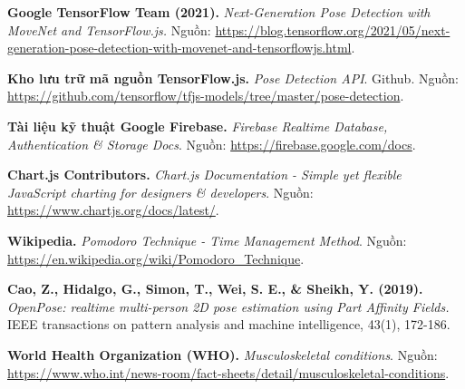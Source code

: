 \documentclass[12pt,a4paper]{report}
\begin{document}
\begin{enumerate}[label={[\arabic*]}]
    \item \textbf{Google TensorFlow Team (2021).} \textit{Next-Generation Pose Detection with MoveNet and TensorFlow.js.} Nguồn: \url{https://blog.tensorflow.org/2021/05/next-generation-pose-detection-with-movenet-and-tensorflowjs.html}.
    
    \item \textbf{Kho lưu trữ mã nguồn TensorFlow.js.} \textit{Pose Detection API}. Github. Nguồn: \url{https://github.com/tensorflow/tfjs-models/tree/master/pose-detection}.
    
    \item \textbf{Tài liệu kỹ thuật Google Firebase.} \textit{Firebase Realtime Database, Authentication \& Storage Docs}. Nguồn: \url{https://firebase.google.com/docs}.
    
    \item \textbf{Chart.js Contributors.} \textit{Chart.js Documentation - Simple yet flexible JavaScript charting for designers \& developers}. Nguồn: \url{https://www.chartjs.org/docs/latest/}.
    
    \item \textbf{Wikipedia.} \textit{Pomodoro Technique - Time Management Method}. Nguồn: \url{https://en.wikipedia.org/wiki/Pomodoro_Technique}.
    
    \item \textbf{Cao, Z., Hidalgo, G., Simon, T., Wei, S. E., \& Sheikh, Y. (2019).} \textit{OpenPose: realtime multi-person 2D pose estimation using Part Affinity Fields.} IEEE transactions on pattern analysis and machine intelligence, 43(1), 172-186.
    
    \item \textbf{World Health Organization (WHO).} \textit{Musculoskeletal conditions}. Nguồn: \url{https://www.who.int/news-room/fact-sheets/detail/musculoskeletal-conditions}.
\end{enumerate}
\end{document}
